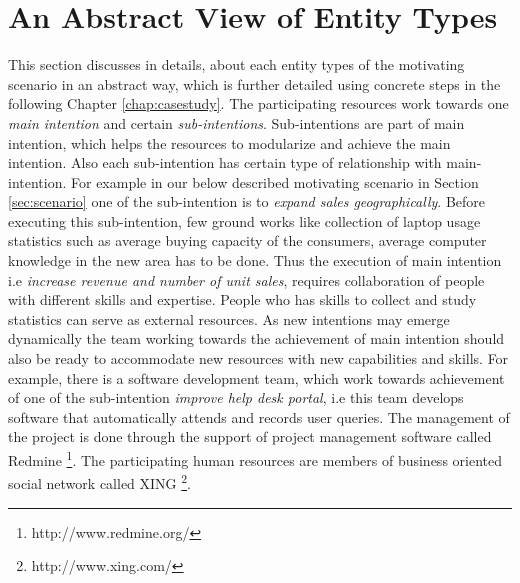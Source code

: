 \section{An Abstract View of Entity Types}
\label{sec:entities}
This section discusses in details, about each entity types of the motivating scenario in an abstract way, which is further detailed using concrete steps in the following Chapter \ref{chap:casestudy}. The participating resources work towards one \textit{main intention} and certain \textit{sub-intentions}. Sub-intentions are part of main intention, which helps the resources to modularize and achieve the main intention. Also each sub-intention has certain type of relationship with main-intention. For example in our below described motivating scenario in Section \ref{sec:scenario} one of the sub-intention is to \textit{expand sales geographically}. Before executing this sub-intention, few ground works like collection of laptop usage statistics such as average buying capacity of the consumers, average computer knowledge in the new area has to be done. Thus the execution of main intention i.e \textit{increase revenue and number of unit sales}, requires collaboration of people with different skills and expertise. People who has skills to collect and study statistics can serve as external resources. As new intentions may emerge dynamically the team working towards the achievement of main intention should also be ready to accommodate new resources with new capabilities and skills. For example, there is a software development team, which work towards achievement of one of the sub-intention \textit{improve help desk portal}, i.e this team develops software that automatically attends and records user queries.  The management of the project is done through the support of project management software called Redmine \footnote{http://www.redmine.org/}. The participating human resources are members of business oriented social network called XING \footnote{http://www.xing.com/}.

